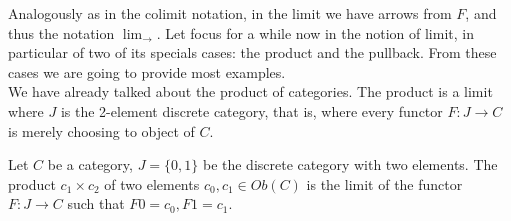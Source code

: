 Analogously as in the colimit notation, in the limit we have arrows from $F$, and thus the notation $\lim_{\rightarrow}$. Let focus for a while now in the notion of limit, in particular of two of its specials cases: the product and the pullback. From these cases we are going to provide most examples. \\

We have already talked about the product of categories. The product is a limit where $J$ is the 2-element discrete category, that is, where every functor $F:J\to C$ is merely choosing to object of $C$. 

\begin{definition}\label{prod-univ}
  Let $C$ be a category, $J=\{0,1\}$ be the discrete category with two elements. The product $c_1\times c_2$ of two elements $c_0,c_1\in Ob(C)$ is the limit of the functor $F:J\to C$ such that $F0 = c_0, F1= c_1$.
\end{definition}

